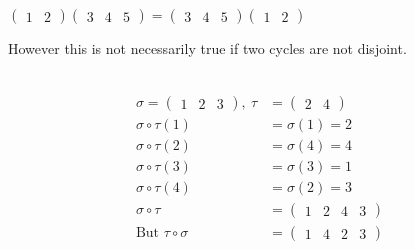 \begin{example}
\(\begin{pmatrix}1 & 2\end{pmatrix} \begin{pmatrix}3 & 4 & 5\end{pmatrix} = \begin{pmatrix}3 & 4 & 5\end{pmatrix} \begin{pmatrix}1 & 2\end{pmatrix}\)
\end{example}

However this is not necessarily true if two cycles are not disjoint.

\begin{example} ~\vspace*{-1.5\baselineskip}
\begin{align*}
    \sigma = \begin{pmatrix}1 & 2 & 3\end{pmatrix},\ \tau &= \begin{pmatrix}2 & 4\end{pmatrix} \\
    \sigma \circ \tau(1) &= \sigma(1) = 2 \\
    \sigma \circ \tau(2) &= \sigma(4) = 4 \\
    \sigma \circ \tau(3) &= \sigma(3) = 1 \\
    \sigma \circ \tau(4) &= \sigma(2) = 3 \\
    \sigma \circ \tau &= \begin{pmatrix}1 & 2 & 4 & 3\end{pmatrix} \\
    \text{But } \tau \circ \sigma &= \begin{pmatrix} 1 & 4 & 2 & 3 \end{pmatrix}
\end{align*}
\end{example}

